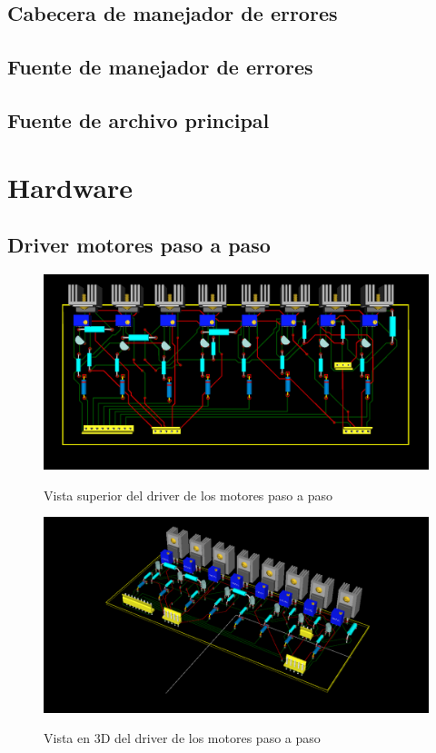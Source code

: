 \subsection{Cabecera de manejador de errores}


\subsection{Fuente de manejador de errores}\label{cap:errors}


\subsection{Fuente de archivo principal}


\newpage
\section{Hardware}
\subsection{Driver motores paso a paso}

\begin{figure}[htp]
  \centering
  \includegraphics[width=14cm]{./img/driver_3d_1.png}
  \label{fig:driver_3d_1}
  \caption{Vista superior del driver de los motores paso a paso}
\end{figure}

\begin{figure}[hb]
  \centering
  \includegraphics[width=14cm]{./img/driver_3d_2.png}
  \label{fig:driver_3d_2}
  \caption{Vista en 3D del driver de los motores paso a paso}
\end{figure}


